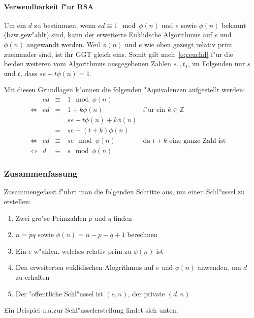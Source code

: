 \documentclass[12pt]{article}
\begin{document}
\paragraph{Verwendbarkeit f"ur RSA}

Um ein $d$ zu bestimmen, wenn $ed \equiv 1 \mod \phi(n) $ und $e$ sowie $\phi(n)$ bekannt (bzw.\@ gew"ahlt) sind,
kann der erweiterte Euklidsche Algorithmus auf $e$ und $\phi(n)$ angewandt werden.
Weil $\phi(n)$ und $e$ wie oben gezeigt relativ prim zueinander sind, ist ihr GGT gleich eins.
Somit gilt nach~\eqref{eq:euclid} f"ur die beiden weiteren vom Algorithmus ausgegebenen Zahlen $s_1, t_1$,
im Folgenden nur $s$ und $t$, dass $se + t\phi(n) = 1$.

\noindent Mit diesen Grundlagen k"onnen die folgenden "Aquivalenzen aufgestellt werden:
\[\begin{aligned}
      &ed &\equiv&~1 \mod \phi(n)& \\
      \iff&ed &=&~1 + k \phi(n) &\textrm{f"ur ein }k \in \mathbb{Z}\\
      &&=&~se + t\phi(n) + k\phi(n)& \\
      &&=&~se + (t+k)\phi(n) &\\
      \iff& ed &\equiv&~se \mod \phi(n) &\textrm{da }t+k\textrm{ eine ganze Zahl ist}\\
      \iff& d &\equiv&~s \mod \phi(n)
  \end{aligned}
\]

\subsubsection{Zusammenfassung}

Zusammengefasst f"uhrt man die folgenden Schritte aus, um einen Schl"ussel zu erstellen:

\begin{enumerate}
    \item Zwei gro"se Primzahlen $p$ und $q$ finden
    \item $n = pq$ sowie $\phi(n) = n - p - q + 1$ berechnen
    \item Ein $e$ w"ahlen, welches relativ prim zu $\phi(n)$ ist
    \item Den erweiterten euklidischen Alogrithmus auf $e$ und $\phi(n)$ anwenden, um $d$ zu erhalten
    \item Der "offentliche Schl"ussel ist $(e, n)$, der private $(d, n)$
\end{enumerate}

\noindent
Ein Beispiel u.a.\@ zur Schl"usselerstellung findet sich unten.
\end{document}
